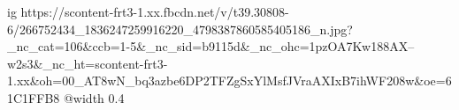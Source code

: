  
 
 
 
 

\ifcmt
  ig https://scontent-frt3-1.xx.fbcdn.net/v/t39.30808-6/266752434_1836247259916220_4798387860585405186_n.jpg?_nc_cat=106&ccb=1-5&_nc_sid=b9115d&_nc_ohc=1pzOA7Kw188AX--w2s3&_nc_ht=scontent-frt3-1.xx&oh=00_AT8wN_bq3azbe6DP2TFZgSxYlMsfJVraAXIxB7ihWF208w&oe=61C1FFB8
  @width 0.4
\fi
